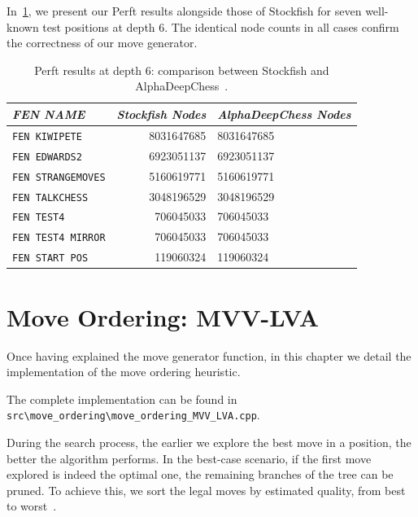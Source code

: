 \vspace{1em}

\noindent In~\cref{tab:perftResults}, we present our Perft results alongside those of Stockfish for seven well-known test positions at depth 6. The identical node counts in all cases confirm the correctness of our move generator.

\begin{table}[H]
    \centering
    \begin{tabular}{|l|r|l|}
    \hline
    \textit{FEN NAME} & \textit{Stockfish Nodes} & \textit{AlphaDeepChess Nodes} \\
    \hline
    \texttt{FEN KIWIPETE}       &  8031647685 &  8031647685   \\
    \texttt{FEN EDWARDS2}       &  6923051137 &  6923051137   \\
    \texttt{FEN STRANGEMOVES}   &  5160619771 &  5160619771   \\
    \texttt{FEN TALKCHESS}      &  3048196529 &  3048196529   \\
    \texttt{FEN TEST4}          &  706045033  &  706045033    \\
    \texttt{FEN TEST4 MIRROR}   &  706045033  &  706045033    \\
    \texttt{FEN START POS}      &  119060324  &  119060324    \\
    \hline
    \end{tabular}
    \caption{Perft results at depth 6: comparison between Stockfish and AlphaDeepChess~\cite{PerftResults}.}\label{tab:perftResults}
\end{table}

\section{Move Ordering: MVV-LVA}
 
Once having explained the move generator function, in this chapter we detail the implementation of the move ordering heuristic.

\vspace{1em}

\noindent \parbox{\textwidth}{The complete implementation can be found in \texttt{src\textbackslash{}move\_ordering\textbackslash{}move\_ordering\_MVV\_LVA.cpp}.}

\vspace{1em}

\noindent During the search process, the earlier we explore the best move in a position, the better the algorithm performs. In the best-case scenario, if the first move explored is indeed the optimal one, the remaining branches of the tree can be pruned. To achieve this, we sort the legal moves by estimated quality, from best to worst~\cite{MoveOrdering}.

